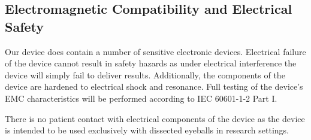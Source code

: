 \subsection{Electromagnetic Compatibility and Electrical Safety}

Our device does contain a number of sensitive electronic
devices. Electrical failure of the device cannot result in safety
hazards as under electrical interference the device will simply fail
to deliver results. Additionally, the components of the device are
hardened to electrical shock and resonance. Full testing of the
device's EMC characteristics will be performed according to IEC
60601-1-2 Part I.

There is no patient contact with electrical components of the device
as the device is intended to be used exclusively with dissected
eyeballs in research settings.



